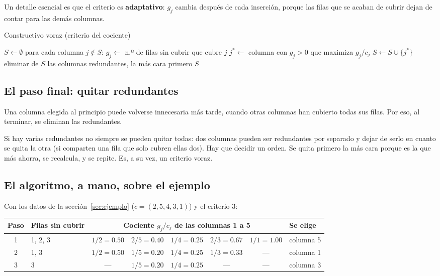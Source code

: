 Un detalle esencial es que el criterio es \textbf{adaptativo}: $g_j$ cambia después de cada
inserción, porque las filas que se acaban de cubrir dejan de contar para las demás columnas.

\begin{algorithm}[H]
\caption{Constructivo voraz (criterio del cociente)}\label{alg:voraz}
\begin{algorithmic}[1]
\State $S\gets\emptyset$
  \State para cada columna $j\notin S$: $g_j\gets$ n.º de filas sin cubrir que cubre $j$
  \State $j^\ast\gets$ columna con $g_j>0$ que maximiza $g_j/c_j$
  \State $S\gets S\cup\{j^\ast\}$
\EndWhile
\State eliminar de $S$ las columnas redundantes, la más cara primero
\State \Return $S$
\end{algorithmic}
\end{algorithm}

\subsection{El paso final: quitar redundantes}

Una columna elegida al principio puede volverse innecesaria más tarde, cuando otras columnas
han cubierto todas sus filas. Por eso, al terminar, se eliminan las redundantes.

\begin{decision}
Si hay varias redundantes no siempre se pueden quitar todas: dos columnas pueden ser
redundantes por separado y dejar de serlo en cuanto se quita la otra (si comparten una fila
que solo cubren ellas dos). Hay que decidir un orden. Se quita primero la más cara porque es
la que más ahorra, se recalcula, y se repite. Es, a su vez, un criterio voraz.
\end{decision}

\subsection{El algoritmo, a mano, sobre el ejemplo}

Con los datos de la sección~\ref{sec:ejemplo} ($c=(2,5,4,3,1)$) y el criterio 3:

\begin{center}
\small
\begin{tabular}{@{}clcccccl@{}}
\toprule
Paso & Filas sin cubrir & \multicolumn{5}{c}{Cociente $g_j/c_j$ de las columnas 1 a 5} & Se elige \\ \midrule
1 & 1, 2, 3 & $1/2=0.50$ & $2/5=0.40$ & $1/4=0.25$ & $2/3=0.67$ & $1/1=\mathbf{1.00}$ & columna 5 \\
2 & 1, 3 & $1/2=\mathbf{0.50}$ & $1/5=0.20$ & $1/4=0.25$ & $1/3=0.33$ & --- & columna 1 \\
3 & 3 & --- & $1/5=0.20$ & $1/4=\mathbf{0.25}$ & --- & --- & columna 3 \\
\bottomrule
\end{tabular}
\end{center}

